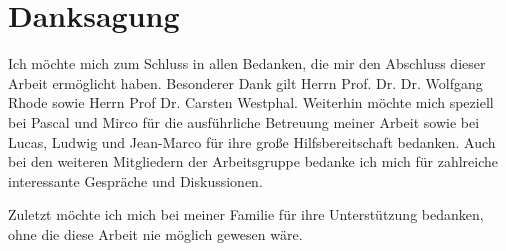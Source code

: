 \documentclass[
  tucolor,       %
  BCOR=12mm,     %
  parskip=half,  %
  open=any,      %
  cleardoublepage=plain,  %
]{tudothesis}
\begin{document}
\backmatter
\printbibliography
\chapter*{Danksagung}
Ich möchte mich zum Schluss in allen Bedanken, die mir den Abschluss dieser Arbeit ermöglicht haben.
Besonderer Dank gilt Herrn Prof. Dr. Dr. Wolfgang Rhode sowie Herrn Prof Dr. Carsten Westphal.
Weiterhin möchte mich speziell bei Pascal und Mirco für die ausführliche Betreuung meiner Arbeit sowie bei Lucas, Ludwig und Jean-Marco für ihre große Hilfsbereitschaft bedanken.
Auch bei den weiteren Mitgliedern der Arbeitsgruppe bedanke ich mich für zahlreiche interessante Gespräche und Diskussionen.

Zuletzt möchte ich mich bei meiner Familie für ihre Unterstützung bedanken, ohne die diese Arbeit nie möglich gewesen wäre.

\cleardoublepage

\end{document}
